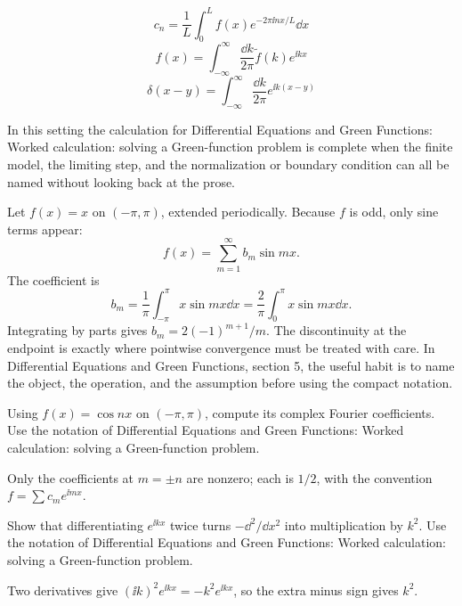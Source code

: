 \[
  c_n=\frac1L\int_0^L f(x)e^{-2\pi\ii nx/L}\dd x
\]
\[
  f(x)=\int_{-\infty}^{\infty}\frac{\dd k}{2\pi}\tilde f(k)e^{\ii kx}
\]
\[
  \delta(x-y)=\int_{-\infty}^{\infty}\frac{\dd k}{2\pi}e^{\ii k(x-y)}
\]

In this setting the calculation for Differential Equations and Green Functions: Worked calculation: solving a Green-function problem is complete when the finite model, the limiting step, and the normalization or boundary condition can all be named without looking back at the prose.




\begin{example}
Let \(f(x)=x\) on \((-\pi,\pi)\), extended periodically.  Because \(f\) is odd, only sine terms appear:
\[
  f(x)=\sum_{m=1}^\infty b_m\sin mx.
\]
The coefficient is
\[
  b_m=\frac1\pi\int_{-\pi}^\pi x\sin mx\dd x
  =\frac2\pi\int_0^\pi x\sin mx\dd x.
\]
Integrating by parts gives \(b_m=2(-1)^{m+1}/m\).  The discontinuity at the endpoint is exactly where pointwise convergence must be treated with care.  In Differential Equations and Green Functions, section 5, the useful habit is to name the object, the operation, and the assumption before using the compact notation.
\end{example}



\begin{exercise}
Using \(f(x)=\cos nx\) on \((-\pi,\pi)\), compute its complex Fourier coefficients.  Use the notation of Differential Equations and Green Functions: Worked calculation: solving a Green-function problem.
\begin{answer}
Only the coefficients at \(m=\pm n\) are nonzero; each is \(1/2\), with the convention \(f=\sum c_me^{\ii mx}\).
\end{answer}
\end{exercise}

\begin{exercise}
Show that differentiating \(e^{\ii kx}\) twice turns \(-\dd^2/\dd x^2\) into multiplication by \(k^2\).  Use the notation of Differential Equations and Green Functions: Worked calculation: solving a Green-function problem.
\begin{answer}
Two derivatives give \((\ii k)^2e^{\ii kx}=-k^2e^{\ii kx}\), so the extra minus sign gives \(k^2\).
\end{answer}
\end{exercise}



